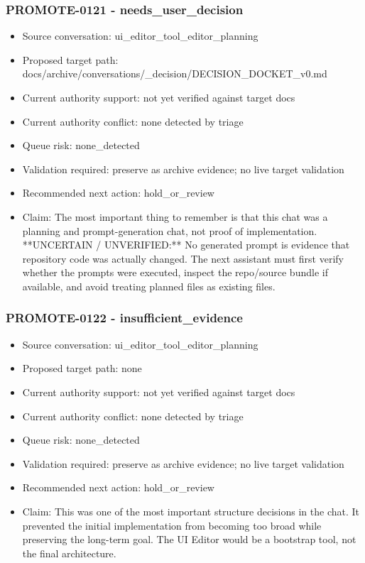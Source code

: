 \documentclass[11pt,a4paper]{report}
\begin{document}
\subsubsection{PROMOTE-0121 - needs\_user\_decision}

\begin{itemize}
\item Source conversation: ui\_editor\_tool\_editor\_planning
\item Proposed target path: docs/archive/conversations/\_decision/DECISION\_DOCKET\_v0.md
\item Current authority support: not yet verified against target docs
\item Current authority conflict: none detected by triage
\item Queue risk: none\_detected
\item Validation required: preserve as archive evidence; no live target validation
\item Recommended next action: hold\_or\_review
\item Claim: The most important thing to remember is that this chat was a planning and prompt-generation chat, not proof of implementation. **UNCERTAIN / UNVERIFIED:** No generated prompt is evidence that repository code was actually changed. The next assistant must first verify whether the prompts were executed, inspect the repo/source bundle if available, and avoid treating planned files as existing files.
\end{itemize}

\subsubsection{PROMOTE-0122 - insufficient\_evidence}

\begin{itemize}
\item Source conversation: ui\_editor\_tool\_editor\_planning
\item Proposed target path: none
\item Current authority support: not yet verified against target docs
\item Current authority conflict: none detected by triage
\item Queue risk: none\_detected
\item Validation required: preserve as archive evidence; no live target validation
\item Recommended next action: hold\_or\_review
\item Claim: This was one of the most important structure decisions in the chat. It prevented the initial implementation from becoming too broad while preserving the long-term goal. The UI Editor would be a bootstrap tool, not the final architecture.
\end{itemize}
\end{document}
